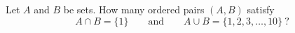 Let $A$ and $B$ be sets. How many ordered pairs $(A,B)$ satisfy
\[
A\cap B=\{1\}\qquad\text{and}\qquad A\cup B=\{1,2,3,\dots,10\}\ ?
\]
